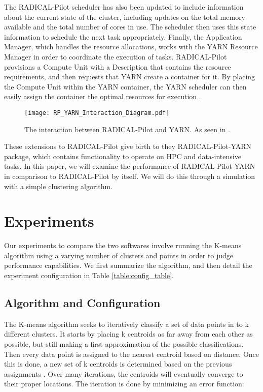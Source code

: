 \documentclass[]{article}
\begin{document}
	The RADICAL-Pilot scheduler has also been updated to include information about the current state of the cluster, including updates on the total memory available and the total number of cores in use. The scheduler then uses this state information to schedule the next task appropriately. Finally, the Application Manager, which handles the resource allocations, works with the YARN Resource Manager in order to coordinate the execution of tasks. RADICAL-Pilot provisions a Compute Unit with a Description that contains the resource requirements, and then requests that YARN create a container for it. By placing the Compute Unit within the YARN container, the YARN scheduler can then easily assign the container the optimal resources for execution \cite{hadoop_paper}. 

	\begin{figure}[H]
		\centering
		\texttt{[image: RP\_YARN\_Interaction\_Diagram.pdf]}
		\caption{The interaction between RADICAL-Pilot and YARN. As seen in \cite{hadoop_paper}.}
		\label{fig:rp_yarn_interaction}
	\end{figure}

	These extensions to RADICAL-Pilot give birth to they RADICAL-Pilot-YARN package, which contains functionality to operate on HPC and data-intensive tasks. In this paper, we will examine the performance of RADICAL-Pilot-YARN in comparison to RADICAL-Pilot by itself. We will do this through a simulation with a simple clustering algorithm.

\section{Experiments}

	Our experiments to compare the two softwares involve running the K-means algorithm using a varying number of clusters and points in order to judge performance capabilities. We first summarize the algorithm, and then detail the experiment configuration in Table \ref{table:config_table}.

	\subsection{Algorithm and Configuration}
		The K-means algorithm seeks to iteratively classify a set of data points in to k different clusters. It starts by placing k centroids as far away from each other as possible, but still making a first approximation of the possible classifications. Then every data point is assigned to the nearest centroid based on distance. Once this is done, a new set of k centroids is determined based on the previous assignments \cite{k_means}. Over many iterations, the centroids will eventually converge to their proper locations. The iteration is done by minimizing an error function:
\end{document}
